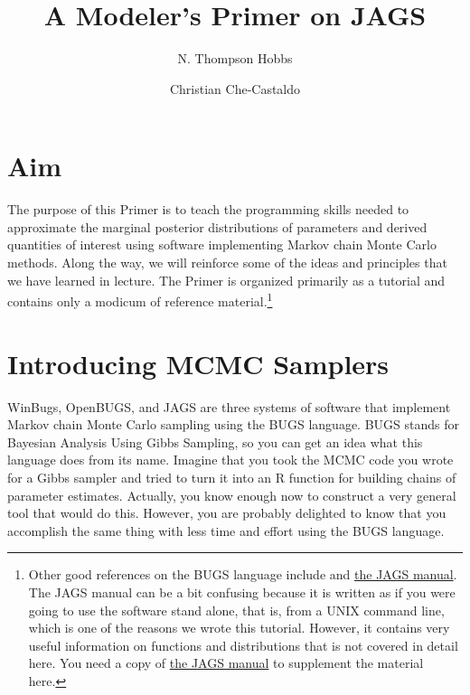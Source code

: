 \documentclass[12pt,english]{article}
\begin{document}
\title{A Modeler's Primer on JAGS}

\author[1]{N. Thompson Hobbs}
\author[2]{Christian Che-Castaldo}


\maketitle

\newpage

\tableofcontents{}
\listofalgorithms
\listofexercises

\newpage

\section{Aim}

The purpose of this Primer is to teach the programming skills needed to approximate the marginal posterior distributions of parameters and derived quantities of interest using software implementing Markov chain Monte Carlo methods. Along the way, we will reinforce some of the ideas and principles that we have learned in lecture. The Primer is organized primarily as a tutorial and contains only a modicum of reference material.\footnote{Other good references on the BUGS language include \citet{McCarthy_Bayes_book} and \href{https://sourceforge.net/projects/mcmc-jags/files/Manuals/4.x/}{the JAGS manual}. The JAGS manual can be a bit confusing because it is written as if you were going to use the software stand alone, that is, from a UNIX command line, which is one of the reasons we wrote this tutorial. However, it contains very useful information on functions and distributions that is not covered in detail here. You need a copy of \href{https://sourceforge.net/projects/mcmc-jags/files/Manuals/4.x/}{the JAGS manual} to supplement the material here.}

\section{Introducing MCMC Samplers}

WinBugs, OpenBUGS, and JAGS are three systems of software that implement Markov chain Monte Carlo sampling using the BUGS language. BUGS stands for Bayesian Analysis Using Gibbs Sampling, so you can get an idea what this language does from its name. Imagine that you took the MCMC code you wrote for a Gibbs sampler and tried to turn it into an R function for building chains of parameter estimates. Actually, you know enough now to construct a very general tool that would do this. However, you are probably delighted to know that you accomplish the same thing with less time and effort using the BUGS language. 
\end{document}
